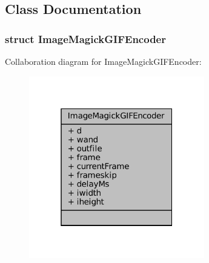 \subsection{Class Documentation}
\label{struct_image_magick_g_i_f_encoder}
\subsubsection{struct Image\+Magick\+G\+I\+F\+Encoder}


Collaboration diagram for Image\+Magick\+G\+I\+F\+Encoder\+:
\nopagebreak
\begin{figure}[H]
\begin{center}
\leavevmode
\includegraphics[width=217pt]{struct_image_magick_g_i_f_encoder__coll__graph}
\end{center}
\end{figure}
